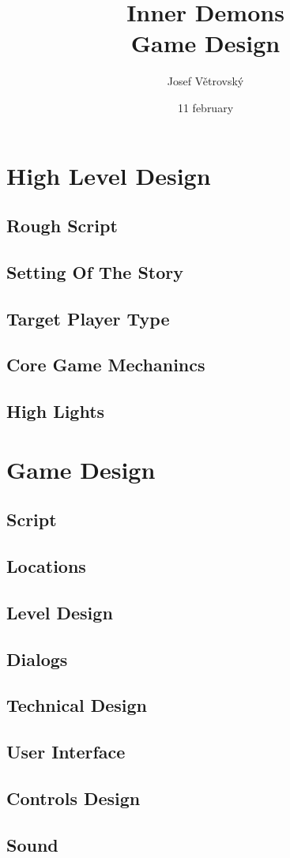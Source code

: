 \documentclass{article}
\title{Inner Demons\\Game Design}
\author{Josef Větrovský}
\date{11 february}
\begin{document}
\maketitle
\thispagestyle{empty}
\cleardoublepage
\tableofcontents
\thispagestyle{empty}
\cleardoublepage
\setcounter{page}{1}
\section{High Level Design}\label{high}
\subsection{Rough Script}
\subsection{Setting Of The Story}
\subsection{Target Player Type}
\subsection{Core Game Mechanincs}
\subsection{High Lights}
\cleardoublepage
\section{Game Design}
\subsection{Script}
\subsection{Locations}
\subsection{Level Design}
\subsection{Dialogs}
\subsection{Technical Design}
\subsection{User Interface}
\subsection{Controls Design}
\subsection{Sound}
\end{document}
